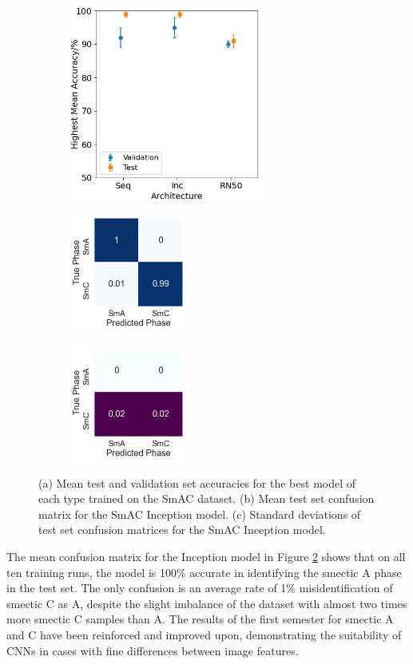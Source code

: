 \documentclass[12pt]{article}
\begin{document}
\begin{figure}[!h]
\centering
\begin{subfigure}{0.4\textwidth}
	\centering
	\includegraphics[width=2.5in]{images/Graphs/SmAC.png}
	\caption{}
	\label{smac:graph}
\end{subfigure}%
\begin{subfigure}{0.25\textwidth}
	\centering
	\includegraphics[width=1.5in]{images/ConMats/SmAC_mean.png}
	\caption{}
	\label{smac:mean}
\end{subfigure}%
\begin{subfigure}{0.25\textwidth}
	\centering
	\includegraphics[width=1.5in]{images/ConMats/SmAC_std.png}
	\caption{}
	\label{smac:std}
\end{subfigure}%
\caption{(a) Mean test and validation set accuracies for the best model of each type trained on the SmAC dataset. (b) Mean test set confusion matrix for the SmAC Inception model. (c) Standard deviations of test set confusion matrices for the SmAC Inception model.}
\label{smac:smac}
\end{figure}

The mean confusion matrix for the Inception model in Figure \ref{smac:mean} shows that on all ten training runs, the model is 100\% accurate in identifying the smectic A phase in the test set. The only confusion is an average rate of 1\% misidentification of smectic C as A, despite the slight imbalance of the dataset with almost two times more smectic C samples than A. The results of the first semester for smectic A and C have been reinforced and improved upon, demonstrating the suitability of CNNs in cases with fine differences between image features. 
\end{document}
